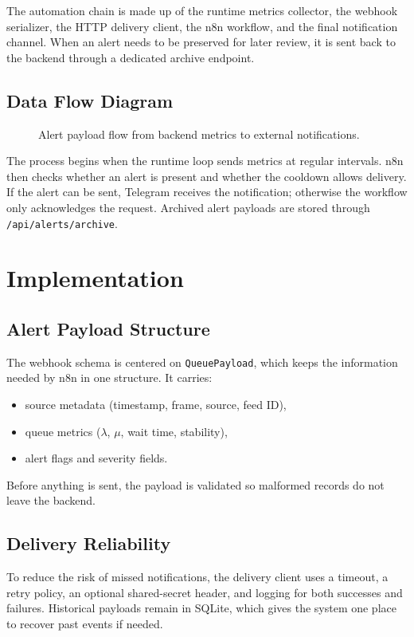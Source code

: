 The automation chain is made up of the runtime metrics collector, the webhook serializer, the HTTP delivery client, the n8n workflow, and the final notification channel. When an alert needs to be preserved for later review, it is sent back to the backend through a dedicated archive endpoint.

\subsection{Data Flow Diagram}
\begin{figure}[H]
    \centering
    \caption{Alert payload flow from backend metrics to external notifications.}
    \label{fig:sprint6_data_flow}
\end{figure}

The process begins when the runtime loop sends metrics at regular intervals. n8n then checks whether an alert is present and whether the cooldown allows delivery. If the alert can be sent, Telegram receives the notification; otherwise the workflow only acknowledges the request. Archived alert payloads are stored through \texttt{/api/alerts/archive}.

\section{Implementation}
\subsection{Alert Payload Structure}
The webhook schema is centered on \texttt{QueuePayload}, which keeps the information needed by n8n in one structure. It carries:
\begin{itemize}
    \item source metadata (timestamp, frame, source, feed ID),
    \item queue metrics ($\lambda$, $\mu$, wait time, stability),
    \item alert flags and severity fields.
\end{itemize}
Before anything is sent, the payload is validated so malformed records do not leave the backend.

\subsection{Delivery Reliability}
To reduce the risk of missed notifications, the delivery client uses a timeout, a retry policy, an optional shared-secret header, and logging for both successes and failures. Historical payloads remain in SQLite, which gives the system one place to recover past events if needed.

